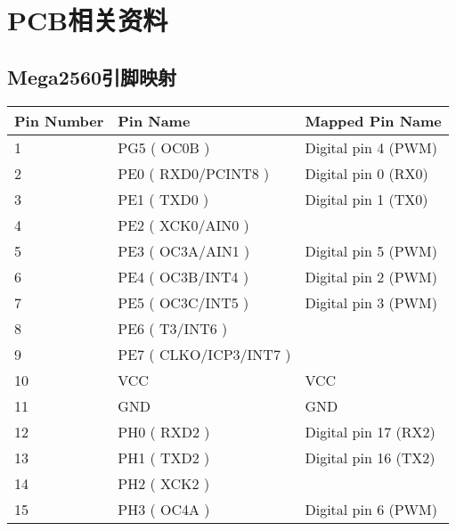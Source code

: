 \chapter{PCB相关资料}
\label{cha:Appendix-PCB}

\section{Mega2560引脚映射}
\label{sec:Pin2560}
\begin{longtable}[c]{|l|l|l|}
    \hline
    Pin Number & Pin Name                 & Mapped Pin Name       \\ \hline
    \endfirsthead
    \endhead
    1          & PG5 ( OC0B )             & Digital pin 4 (PWM)   \\ \hline
    2          & PE0 ( RXD0/PCINT8 )      & Digital pin 0 (RX0)   \\ \hline
    3          & PE1 ( TXD0 )             & Digital pin 1 (TX0)   \\ \hline
    4          & PE2 ( XCK0/AIN0 )        &                       \\ \hline
    5          & PE3 ( OC3A/AIN1 )        & Digital pin 5 (PWM)   \\ \hline
    6          & PE4 ( OC3B/INT4 )        & Digital pin 2 (PWM)   \\ \hline
    7          & PE5 ( OC3C/INT5 )        & Digital pin 3 (PWM)   \\ \hline
    8          & PE6 ( T3/INT6 )          &                       \\ \hline
    9          & PE7 ( CLKO/ICP3/INT7 )   &                       \\ \hline
    10         & VCC                      & VCC                   \\ \hline
    11         & GND                      & GND                   \\ \hline
    12         & PH0 ( RXD2 )             & Digital pin 17 (RX2)  \\ \hline
    13         & PH1 ( TXD2 )             & Digital pin 16 (TX2)  \\ \hline
    14         & PH2 ( XCK2 )             &                       \\ \hline
    15         & PH3 ( OC4A )             & Digital pin 6 (PWM)   \\ \hline

\end{longtable}
